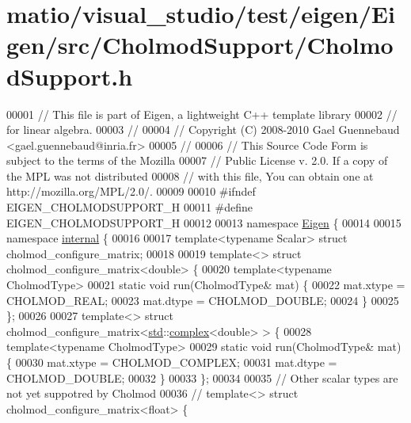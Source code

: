 \hypertarget{matio_2visual__studio_2test_2eigen_2_eigen_2src_2_cholmod_support_2_cholmod_support_8h_source}{}\section{matio/visual\+\_\+studio/test/eigen/\+Eigen/src/\+Cholmod\+Support/\+Cholmod\+Support.h}
\label{matio_2visual__studio_2test_2eigen_2_eigen_2src_2_cholmod_support_2_cholmod_support_8h_source}

\begin{DoxyCode}
00001 \textcolor{comment}{// This file is part of Eigen, a lightweight C++ template library}
00002 \textcolor{comment}{// for linear algebra.}
00003 \textcolor{comment}{//}
00004 \textcolor{comment}{// Copyright (C) 2008-2010 Gael Guennebaud <gael.guennebaud@inria.fr>}
00005 \textcolor{comment}{//}
00006 \textcolor{comment}{// This Source Code Form is subject to the terms of the Mozilla}
00007 \textcolor{comment}{// Public License v. 2.0. If a copy of the MPL was not distributed}
00008 \textcolor{comment}{// with this file, You can obtain one at http://mozilla.org/MPL/2.0/.}
00009 
00010 \textcolor{preprocessor}{#ifndef EIGEN\_CHOLMODSUPPORT\_H}
00011 \textcolor{preprocessor}{#define EIGEN\_CHOLMODSUPPORT\_H}
00012 
00013 \textcolor{keyword}{namespace }\hyperlink{namespace_eigen}{Eigen} \{ 
00014 
00015 \textcolor{keyword}{namespace }\hyperlink{namespaceinternal}{internal} \{
00016 
00017 \textcolor{keyword}{template}<\textcolor{keyword}{typename} Scalar> \textcolor{keyword}{struct }cholmod\_configure\_matrix;
00018 
00019 \textcolor{keyword}{template}<> \textcolor{keyword}{struct }cholmod\_configure\_matrix<double> \{
00020   \textcolor{keyword}{template}<\textcolor{keyword}{typename} CholmodType>
00021   \textcolor{keyword}{static} \textcolor{keywordtype}{void} run(CholmodType& mat) \{
00022     mat.xtype = CHOLMOD\_REAL;
00023     mat.dtype = CHOLMOD\_DOUBLE;
00024   \}
00025 \};
00026 
00027 \textcolor{keyword}{template}<> \textcolor{keyword}{struct }cholmod\_configure\_matrix<\hyperlink{namespacestd}{std}::\hyperlink{structcomplex}{complex}<double> > \{
00028   \textcolor{keyword}{template}<\textcolor{keyword}{typename} CholmodType>
00029   \textcolor{keyword}{static} \textcolor{keywordtype}{void} run(CholmodType& mat) \{
00030     mat.xtype = CHOLMOD\_COMPLEX;
00031     mat.dtype = CHOLMOD\_DOUBLE;
00032   \}
00033 \};
00034 
00035 \textcolor{comment}{// Other scalar types are not yet suppotred by Cholmod}
00036 \textcolor{comment}{// template<> struct cholmod\_configure\_matrix<float> \{}

\end{DoxyCode}
